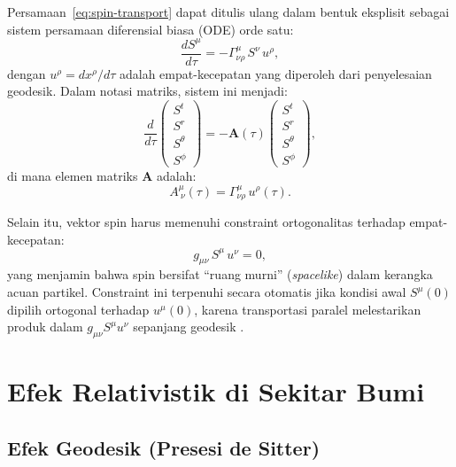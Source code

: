 Persamaan~\eqref{eq:spin-transport} dapat ditulis ulang dalam bentuk eksplisit sebagai sistem persamaan diferensial biasa (ODE) orde satu:
\begin{equation}
    \frac{dS^\mu}{d\tau} = -\Gamma^\mu_{\nu\rho}\, S^\nu\, u^\rho,
    \label{eq:spin-ode}
\end{equation}
dengan $u^\rho = dx^\rho/d\tau$ adalah empat-kecepatan yang diperoleh dari penyelesaian geodesik. Dalam notasi matriks, sistem ini menjadi:
\begin{equation}
    \frac{d}{d\tau}
    \begin{pmatrix} S^t \\ S^r \\ S^\theta \\ S^\phi \end{pmatrix}
    = -\mathbf{A}(\tau)
    \begin{pmatrix} S^t \\ S^r \\ S^\theta \\ S^\phi \end{pmatrix},
    \label{eq:spin-matrix}
\end{equation}
di mana elemen matriks $\mathbf{A}$ adalah:
\begin{equation}
    A^\mu_{\ \nu}(\tau) = \Gamma^\mu_{\nu\rho}\, u^\rho(\tau).
    \label{eq:matrix-A}
\end{equation}

Selain itu, vektor spin harus memenuhi constraint ortogonalitas terhadap empat-kecepatan:
\begin{equation}
    g_{\mu\nu}\, S^\mu\, u^\nu = 0,
    \label{eq:spin-constraint}
\end{equation}
yang menjamin bahwa spin bersifat ``ruang murni'' (\textit{spacelike}) dalam kerangka acuan partikel. Constraint ini terpenuhi secara otomatis jika kondisi awal $S^\mu(0)$ dipilih ortogonal terhadap $u^\mu(0)$, karena transportasi paralel melestarikan produk dalam $g_{\mu\nu} S^\mu u^\nu$ sepanjang geodesik \parencite{Carroll2004SpacetimeGeometry}.


\section{Efek Relativistik di Sekitar Bumi}
\label{sec:efek-relativistik}

\subsection{Efek Geodesik (Presesi de Sitter)}
\label{subsec:efek-geodesik}


